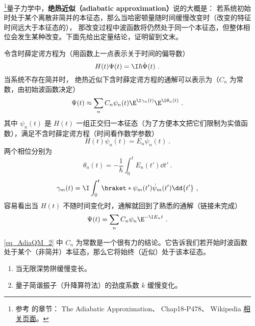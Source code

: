 
\begin{issues}
\issueTODO
\end{issues}

\footnote{参考 \cite{GriffE} 的章节： The Adiabatic Approximation、 \cite{Shankar} Chap18-P478、 Wikipedia \href{https://en.wikipedia.org/wiki/Adiabatic_theorem}{相关页面}。}量子力学中，\textbf{绝热近似（adiabatic approximation）}说的大概是： 若系统初始时处于某个离散非简并的本征态，那么当哈密顿量随时间缓慢改变时（改变的特征时间远大于本征态的）， 那改变过程中波函数将仍然处于同一个本征态，但整体相位会发生某种改变。下面先给出定量结论，证明留到文末。

令含时薛定谔方程为（用函数上一点表示关于时间的偏导数）
\begin{equation}
H(t)\Psi(t) = \I\hbar\dot\Psi(t)~.
\end{equation}
当系统不存在简并时， 绝热近似下含时薛定谔方程的通解可以表示为（$C_n$ 为常数，由初始波函数决定）
\begin{equation}\label{eq_AdiaQM_2}
\Psi(t) \approx \sum_n C_n \psi_n(t) \E^{\I\gamma_n(t)}\E^{\I\theta_n(t)}~.
\end{equation}
其中 $\psi_n(t)$ 是 $H(t)$ 一组正交归一本征态（为了方便本文把它们限制为实值函数），满足不含时薛定谔方程（时间看作数学参数）
\begin{equation}
H(t)\psi_n(t) = E_n\psi_n(t)~.
\end{equation}
两个相位分别为
\begin{equation}
\theta_n(t) = -\frac{1}{\hbar} \int_0^t E_n(t')\dd{t'}~.
\end{equation}
\begin{equation}
\gamma_m(t) = \I\int_0^t \braket*{\psi_m(t')}{\dot\psi_m(t')}\dd{t'}~,
\end{equation}
容易看出当 $H(t)$ 不随时间变化时，通解就回到了熟悉的通解（链接未完成）
\begin{equation}
\Psi(t) = \sum_n C_n \psi_n \E^{-\I E_n t}~.
\end{equation}

\autoref{eq_AdiaQM_2} 中 $C_n$ 为常数是一个很有力的结论。它告诉我们若开始时波函数处于某个（非简并）本征态，那么它将始终（近似）处于该本征态。

\begin{example}{}
\begin{enumerate}
\item 当无限深势阱缓慢变长。
\item 量子简谐振子（升降算符法）的劲度系数 $k$ 缓慢变化。
\end{enumerate}
\end{example}

